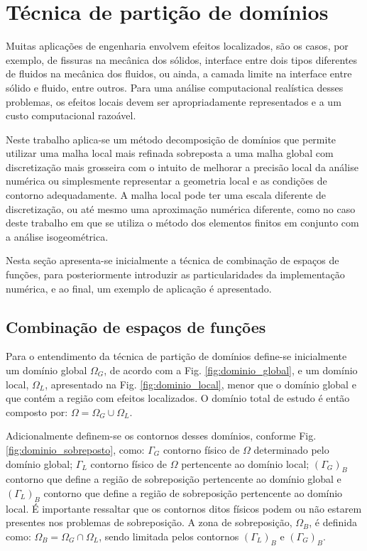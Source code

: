 \documentclass[tese_patricia]{subfiles}
\begin{document}
\chapter[Técnica de partição de domínios]{Técnica de partição de domínios} \label{capitulo:Cap5}

Muitas aplicações de engenharia envolvem efeitos localizados, são os casos, por exemplo, de fissuras na mecânica dos sólidos, interface entre dois tipos diferentes de fluidos na mecânica dos fluidos, ou ainda, a camada limite na interface entre sólido e fluido, entre outros. Para uma análise computacional realística desses problemas, os efeitos locais devem ser apropriadamente representados e a um custo computacional razoável. 

Neste trabalho aplica-se um método decomposição de domínios que permite utilizar uma malha local mais refinada sobreposta a uma malha global com discretização mais grosseira com o intuito de melhorar a precisão local da análise numérica ou simplesmente representar a geometria local e as condições de contorno adequadamente. A malha local pode ter uma escala diferente de discretização, ou até mesmo uma aproximação numérica diferente, como no caso deste trabalho em que se utiliza o método dos elementos finitos em conjunto com a análise isogeométrica.

Nesta seção apresenta-se inicialmente a técnica de combinação de espaços de funções, para posteriormente introduzir as particularidades da implementação numérica, e ao final, um exemplo de aplicação é apresentado.

\section{Combinação de espaços de funções}

Para o entendimento da técnica de partição de domínios define-se inicialmente um domínio global $\Omega_G$, de acordo com a Fig. \ref{fig:dominio_global}, e um domínio local, $\Omega_L$, apresentado na Fig. \ref{fig:dominio_local}, menor que o domínio global e que contém a região com efeitos localizados. O domínio total de estudo é então composto por: $\Omega = \Omega_G \cup \Omega_L$.

Adicionalmente definem-se os contornos desses domínios, conforme Fig. \ref{fig:dominio_sobreposto}, como: $\Gamma_{G}$ contorno físico de $\Omega$ determinado pelo domínio global; $\Gamma_{L}$ contorno físico de $\Omega$ pertencente ao domínio local; $(\Gamma_{G})_{B}$ contorno que define a região de sobreposição pertencente ao domínio global e $(\Gamma_{L})_{B}$ contorno que define a região de sobreposição pertencente ao domínio local. É importante ressaltar que os contornos ditos físicos podem ou não estarem presentes nos problemas de sobreposição. A zona de sobreposição, $\Omega_{B}$, é definida como: $ \Omega_{B} = \Omega_G \cap \Omega_L$, sendo limitada pelos contornos $(\Gamma_{L})_{B}$ e $(\Gamma_{G})_{B}$.
\end{document}
